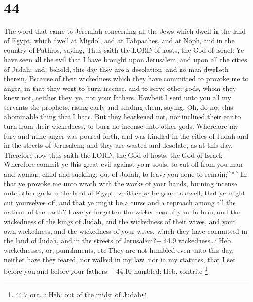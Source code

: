 \hypertarget{section-43}{%
\section{44}\label{section-43}}

 The word that came to Jeremiah concerning all the Jews
which dwell in the land of Egypt, which dwell at Migdol, and at
Tahpanhes, and at Noph, and in the country of Pathros, saying,
 Thus saith the LORD of hosts, the God of Israel; Ye have
seen all the evil that I have brought upon Jerusalem, and upon all the
cities of Judah; and, behold, this day they are a desolation, and no man
dwelleth therein,  Because of their wickedness which they
have committed to provoke me to anger, in that they went to burn
incense, and to serve other gods, whom they knew not, neither they, ye,
nor your fathers.  Howbeit I sent unto you all my servants
the prophets, rising early and sending them, saying, Oh, do not this
abominable thing that I hate.  But they hearkened not, nor
inclined their ear to turn from their wickedness, to burn no incense
unto other gods.  Wherefore my fury and mine anger was
poured forth, and was kindled in the cities of Judah and in the streets
of Jerusalem; and they are wasted and desolate, as at this day.
 Therefore now thus saith the LORD, the God of hosts, the
God of Israel; Wherefore commit ye this great evil against your souls,
to cut off from you man and woman, child and suckling, out of Judah, to
leave you none to remain;\^{}*\^{}  In that ye provoke me
unto wrath with the works of your hands, burning incense unto other gods
in the land of Egypt, whither ye be gone to dwell, that ye might cut
yourselves off, and that ye might be a curse and a reproach among all
the nations of the earth?  Have ye forgotten the wickedness
of your fathers, and the wickedness of the kings of Judah, and the
wickedness of their wives, and your own wickedness, and the wickedness
of your wives, which they have committed in the land of Judah, and in
the streets of Jerusalem?+ 44.9 wickedness\ldots: Heb. wickednesses, or,
punishments, etc  They are not humbled even unto this day,
neither have they feared, nor walked in my law, nor in my statutes, that
I set before you and before your fathers.+ 44.10 humbled: Heb. contrite
\footnote{44.7 out\ldots: Heb. out of the midst of Judah}

